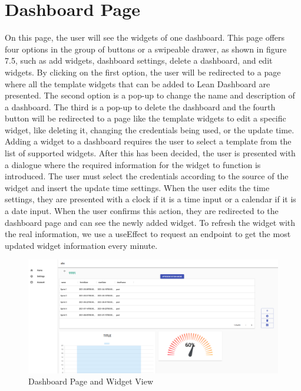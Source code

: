 \documentclass[a4paper,twoside,10pt]{report}
\begin{document}
\newpage
\section{Dashboard Page}
On this page, the user will see the widgets of one dashboard. This page offers four options in the group of buttons or a swipeable drawer, as shown in figure 7.5, such as add widgets, dashboard settings, delete a dashboard, and edit widgets.
By clicking on the first option, the user will be redirected to a page where all the template widgets that can be added to Lean Dashboard are presented.
The second option is a pop-up to change the name and description of a dashboard.
The third is a pop-up to delete the dashboard and the fourth button will be redirected to a page like the template widgets to edit a specific widget, like deleting it, changing the credentials being used, or the update time.
\newline
Adding a widget to a dashboard requires the user to select a template from the list of supported widgets. After this has been decided, the user is presented with a dialogue where the required information for the widget to function is introduced. The user must select the credentials according to the source of the widget and insert the update time settings. When the user edits the time settings, they are presented with a clock if it is a time input or a calendar if it is a date input. When the user confirms this action, they are redirected to the dashboard page and can see the newly added widget. To refresh the widget with the real information, we use a useEffect to request an endpoint to get the most updated widget information every minute.

\newpage
\begin{figure}[h!]
\center
  \includegraphics[width=\textwidth]{dashboardPage.png}
\caption{Dashboard Page and Widget View}
\end{figure}
\end{document}
